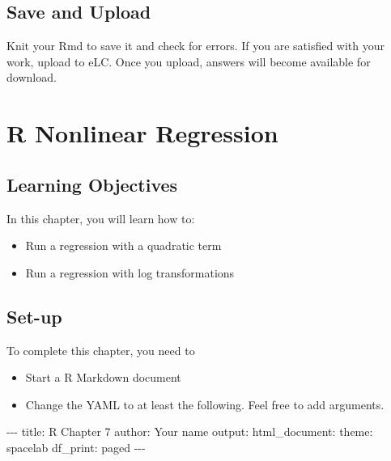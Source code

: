 \documentclass[
]{book}
\makeatletter
\newenvironment{Shaded}{\begin{snugshade}}{\end{snugshade}}
\newcommand{\NormalTok}[1]{#1}
\newcommand{\SpecialCharTok}[1]{\textcolor[rgb]{0,0,0}{#1}}
\newcommand{\StringTok}[1]{\textcolor[rgb]{0.5,0.5,0.5}{#1}}
\providecommand{\tightlist}{%
  \setlength{\itemsep}{0pt}\setlength{\parskip}{0pt}}
\newenvironment{kframe}{%
\medskip{}
\setlength{\fboxsep}{.8em}
 \def\at@end@of@kframe{}%
 \ifinner\ifhmode%
  \def\at@end@of@kframe{\end{minipage}}%
  \begin{minipage}{\columnwidth}%
 \fi\fi%
 \def\FrameCommand##1{\hskip\@totalleftmargin \hskip-\fboxsep
 \colorbox{shadecolor}{##1}\hskip-\fboxsep
     \hskip-\linewidth \hskip-\@totalleftmargin \hskip\columnwidth}%
 \MakeFramed {\advance\hsize-\width
   \@totalleftmargin\z@ \linewidth\hsize
   \@setminipage}}%
 {\par\unskip\endMakeFramed%
 \at@end@of@kframe}
\renewenvironment{Shaded}{\begin{kframe}}{\end{kframe}}
\makeatother
\begin{document}
\hypertarget{save-and-upload}{%
\section{Save and Upload}\label{save-and-upload}}

Knit your Rmd to save it and check for errors. If you are satisfied with your work, upload to eLC. Once you upload, answers will become available for download.

\hypertarget{r-nonlinear-regression}{%
\chapter{R Nonlinear Regression}\label{r-nonlinear-regression}}

\hypertarget{learning-objectives}{%
\section{Learning Objectives}\label{learning-objectives}}

In this chapter, you will learn how to:

\begin{itemize}
\tightlist
\item
  Run a regression with a quadratic term
\item
  Run a regression with log transformations
\end{itemize}

\hypertarget{set-up}{%
\section{Set-up}\label{set-up}}

To complete this chapter, you need to

\begin{itemize}
\tightlist
\item
  Start a R Markdown document
\item
  Change the YAML to at least the following. Feel free to add arguments.
\end{itemize}

\begin{Shaded}
\begin{Highlighting}[]
\SpecialCharTok{{-}{-}{-}}
\NormalTok{title}\SpecialCharTok{:} \StringTok{\textquotesingle{}R Chapter 7\textquotesingle{}}
\NormalTok{author}\SpecialCharTok{:} \StringTok{\textquotesingle{}Your name\textquotesingle{}}
\NormalTok{output}\SpecialCharTok{:} 
\NormalTok{  html\_document}\SpecialCharTok{:}
\NormalTok{    theme}\SpecialCharTok{:}\NormalTok{ spacelab}
\NormalTok{    df\_print}\SpecialCharTok{:}\NormalTok{ paged}
\SpecialCharTok{{-}{-}{-}}
\end{Highlighting}
\end{Shaded}
\end{document}

